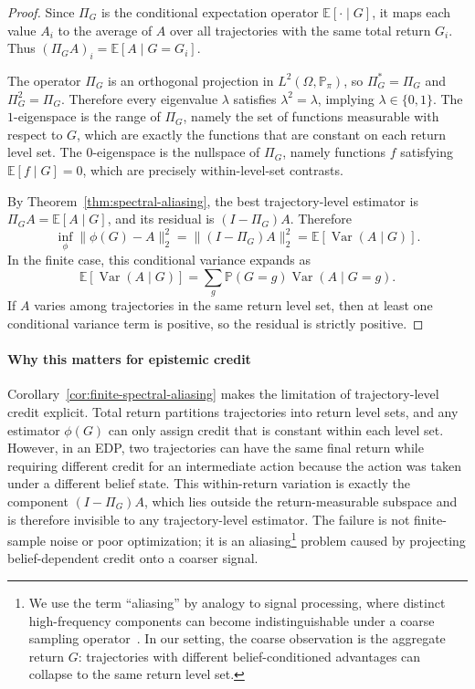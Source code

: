 \documentclass[11pt]{article}
\theoremstyle{plain}
\theoremstyle{definition}
\theoremstyle{remark}
\begin{document}
\begin{proof}
Since \(\Pi_G\) is the conditional expectation operator \(\mathbb{E}[\cdot\mid G]\), it maps each value \(A_i\) to the average of \(A\) over all trajectories with the same total return \(G_i\). Thus \((\Pi_G A)_i=\mathbb{E}[A\mid G=G_i]\).

The operator \(\Pi_G\) is an orthogonal projection in \(L^2(\Omega,\mathbb{P}_\pi)\), so \(\Pi_G^\ast=\Pi_G\) and \(\Pi_G^2=\Pi_G\). Therefore every eigenvalue \(\lambda\) satisfies \(\lambda^2=\lambda\), implying \(\lambda\in\{0,1\}\). The \(1\)-eigenspace is the range of \(\Pi_G\), namely the set of functions measurable with respect to \(G\), which are exactly the functions that are constant on each return level set. The \(0\)-eigenspace is the nullspace of \(\Pi_G\), namely functions \(f\) satisfying \(\mathbb{E}[f\mid G]=0\), which are precisely within-level-set contrasts.

By Theorem~\ref{thm:spectral-aliasing}, the best trajectory-level estimator is \(\Pi_G A=\mathbb{E}[A\mid G]\), and its residual is \((I-\Pi_G)A\). Therefore
\[
    \inf_{\phi}\|\phi(G)-A\|_2^2
    =
    \|(I-\Pi_G)A\|_2^2
    =
    \mathbb{E}[\operatorname{Var}(A\mid G)].
\]
In the finite case, this conditional variance expands as
\[
    \mathbb{E}[\operatorname{Var}(A\mid G)]
    =
    \sum_g
    \mathbb{P}(G=g)\operatorname{Var}(A\mid G=g).
\]
If \(A\) varies among trajectories in the same return level set, then at least one conditional variance term is positive, so the residual is strictly positive.
\end{proof}

\paragraph{Why this matters for epistemic credit}
Corollary~\ref{cor:finite-spectral-aliasing} makes the limitation of trajectory-level credit explicit. Total return partitions trajectories into return level sets, and any estimator \(\phi(G)\) can only assign credit that is constant within each level set. However, in an EDP, two trajectories can have the same final return while requiring different credit for an intermediate action because the action was taken under a different belief state. This within-return variation is exactly the component \((I-\Pi_G)A\), which lies outside the return-measurable subspace and is therefore invisible to any trajectory-level estimator. The failure is not finite-sample noise or poor optimization; it is an aliasing\footnote{We use the term ``aliasing'' by analogy to signal processing, where distinct high-frequency components can become indistinguishable under a coarse sampling operator~\citep{oppenheim1999discrete,shannon2006communication}. In our setting, the coarse observation is the aggregate return \(G\): trajectories with different belief-conditioned advantages can collapse to the same return level set.} problem caused by projecting belief-dependent credit onto a coarser signal. 
 
\end{document}
